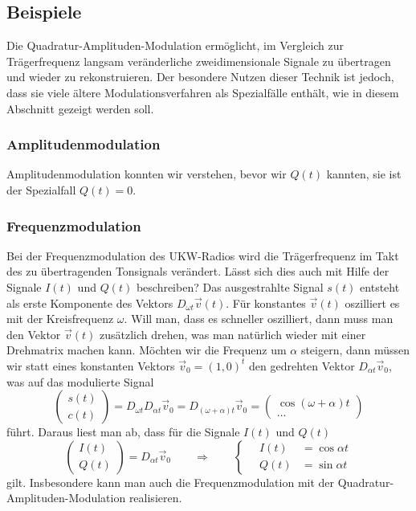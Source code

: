 %
%
%
\subsection{Beispiele
\label{subsection:qam:beispiele}}
Die Quadratur-Amplituden-Modulation ermöglicht, im Vergleich zur
Trägerfrequenz langsam veränderliche zweidimensionale Signale zu
übertragen und wieder zu rekonstruieren.
Der besondere Nutzen dieser Technik ist jedoch, dass sie viele
ältere Modulationsverfahren als Spezialfälle enthält, wie in
diesem Abschnitt gezeigt werden soll.

\subsubsection{Amplitudenmodulation}
Amplitudenmodulation konnten wir verstehen, bevor wir $Q(t)$ kannten,
sie ist der Spezialfall $Q(t)=0$.

\subsubsection{Frequenzmodulation}
Bei der Frequenzmodulation des UKW-Radios wird die Trägerfrequenz
im Takt des zu übertragenden Tonsignals verändert.
Lässt sich dies auch mit Hilfe der Signale $I(t)$ und $Q(t)$
beschreiben?
Das ausgestrahlte Signal $s(t)$ entsteht als erste Komponente
des Vektors $D_{\omega t}\vec{v}(t)$.
Für konstantes $\vec{v}(t)$ oszilliert es mit der Kreisfrequenz $\omega$.
Will man, dass es schneller oszilliert, dann muss man den Vektor
$\vec{v}(t)$ zusätzlich drehen, was man natürlich wieder mit einer
Drehmatrix machen kann.
Möchten wir die Frequenz um $\alpha$  steigern, dann müssen wir
statt eines konstanten Vektors $\vec{v}_0=(1,0)^t$ den gedrehten
Vektor $D_{\alpha t}\vec{v}_0$, was auf das modulierte Signal
\[
\begin{pmatrix}
s(t)\\c(t)
\end{pmatrix}
=
D_{\omega t}D_{\alpha t}\vec{v}_0
=
D_{(\omega+\alpha)t}\vec{v}_0
=
\begin{pmatrix}
\cos(\omega+\alpha)t 
\\
\dots
\end{pmatrix}
\]
führt.
Daraus liest man ab, dass für die Signale $I(t)$ und $Q(t)$
\begin{equation}
\begin{pmatrix}I(t)\\Q(t)\end{pmatrix}
=
D_{\alpha t}\vec{v}_0
\qquad\Rightarrow\qquad
\left\{
\quad
\begin{aligned}
I(t)&=\cos\alpha t\\
Q(t)&=\sin\alpha t
\end{aligned}
\right.
\end{equation}
gilt.
Insbesondere kann man auch die Frequenzmodulation mit der
Quadratur-Amplituden-Modulation realisieren.

